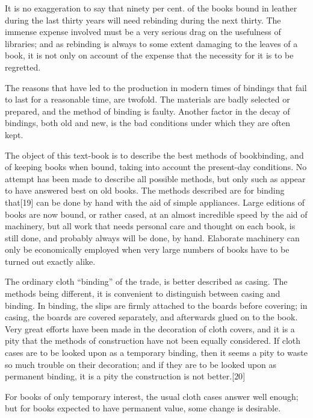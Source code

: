 \documentclass[
]{article}
\begin{document}
It is no exaggeration to say that ninety per cent. of the books bound in
leather during the last thirty years will need rebinding during the next
thirty. The immense expense involved must be a very serious drag on the
usefulness of libraries; and as rebinding is always to some extent
damaging to the leaves of a book, it is not only on account of the
expense that the necessity for it is to be regretted.

The reasons that have led to the production in modern times of bindings
that fail to last for a reasonable time, are twofold. The materials are
badly selected or prepared, and the method of binding is faulty. Another
factor in the decay of bindings, both old and new, is the bad conditions
under which they are often kept.

The object of this text-book is to describe the best methods of
bookbinding, and of keeping books when bound, taking into account the
present-day conditions. No attempt has been made to describe all
possible methods, but only such as appear to have answered best on old
books. The methods described are for binding
that{\protect\hypertarget{Page_19}{}{{[}19{]}}} can be done by hand with
the aid of simple appliances. Large editions of books are now bound, or
rather cased, at an almost incredible speed by the aid of machinery, but
all work that needs personal care and thought on each book, is still
done, and probably always will be done, by hand. Elaborate machinery can
only be economically employed when very large numbers of books have to
be turned out exactly alike.

The ordinary cloth ``binding'' of the trade, is better described as
casing. The methods being different, it is convenient to distinguish
between casing and binding. In binding, the slips are firmly attached to
the boards before covering; in casing, the boards are covered
separately, and afterwards glued on to the book. Very great efforts have
been made in the decoration of cloth covers, and it is a pity that the
methods of construction have not been equally considered. If cloth cases
are to be looked upon as a temporary binding, then it seems a pity to
waste so much trouble on their decoration; and if they are to be looked
upon as permanent binding, it is a pity the construction is not
better.{\protect\hypertarget{Page_20}{}{{[}20{]}}}

For books of only temporary interest, the usual cloth cases answer well
enough; but for books expected to have permanent value, some change is
desirable.
\end{document}
